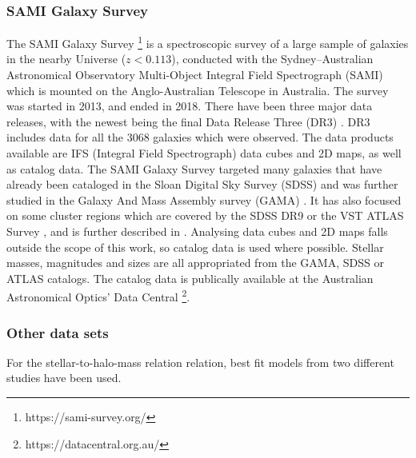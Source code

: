 \subsubsection{SAMI Galaxy Survey}
The SAMI Galaxy Survey \footnote{https://sami-survey.org/} is a spectroscopic survey of a large sample of galaxies in the nearby Universe ($z < 0.113$), conducted with the Sydney–Australian Astronomical Observatory Multi-Object Integral Field Spectrograph (SAMI) which is mounted on the Anglo-Australian Telescope in Australia. The survey was started in 2013, and ended in 2018. There have been three major data releases, with the newest being the final Data Release Three (DR3) \parencite{Scott2021}. DR3 includes data for all the 3068 galaxies which were observed. The data products available are IFS (Integral Field Spectrograph) data cubes and 2D maps, as well as catalog data. The SAMI Galaxy Survey targeted many galaxies that have already been cataloged in the Sloan Digital Sky Survey (SDSS) \parencite{York2000} and was further studied in the Galaxy And Mass Assembly survey (GAMA) \parencite{Driver2011}. It has also focused on some cluster regions which are covered by the SDSS DR9 or the VST ATLAS Survey \parencite{Shanks2013}, and is further described in \textcite{Owers2017}. Analysing data cubes and 2D maps falls outside the scope of this work, so catalog data is used where possible. Stellar masses, magnitudes and sizes are all appropriated from the GAMA, SDSS or ATLAS catalogs. The catalog data is publically available at the Australian Astronomical Optics’ Data Central \footnote{https://datacentral.org.au/}.

\subsubsection{Other data sets}
For the stellar-to-halo-mass relation relation, best fit models from two different studies have been used.



